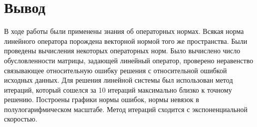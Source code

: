 \documentclass[a4paper]{article}
\begin{document}
\pagebreak

\section{Вывод}
    В ходе работы были применены знания об операторных нормах. Всякая норма линейного оператора порождена векторной нормой того же пространства. Были проведены вычисления некоторых операторных норм.
Было вычислено число обусловленности матрицы, задающей линейный оператор, проверено неравенство связывающее относительную ошибку решения с относительной ошибкой исходных данных.
Для решения линейной системы был использован метод итераций, который сошелся за 10 итераций максимально близко к точному решению. Построены графики нормы ошибок, нормы невязок в полулогарифмическом масштабе.
Метод итераций сходится с экспоненциальной скоростью.
\end{document}
